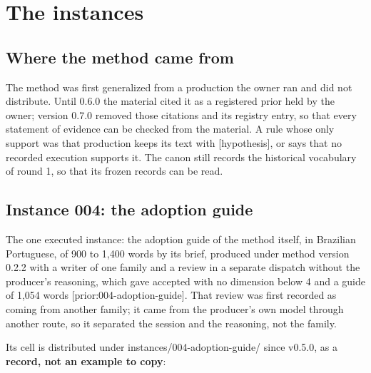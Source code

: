 \documentclass[
  american,
  10pt,
]{report}
\renewcommand{\texttt}[1]{{\ttfamily\hyphenchar\font=-1 #1}}
\begin{document}
\chapter{The instances}\label{the-instances}

\section{Where the method came from}\label{where-the-method-came-from}

The method was first generalized from a production the owner ran and did
not distribute. Until 0.6.0 the material cited it as a registered prior
held by the owner; version 0.7.0 removed those citations and its
registry entry, so that every statement of evidence can be checked from
the material. A rule whose only support was that production keeps its
text with \texttt{[hypothesis]}, or says that no recorded execution
supports it. The canon still records the historical vocabulary of round
1, so that its frozen records can be read.

\section{Instance 004: the adoption
guide}\label{instance-004-the-adoption-guide}

The one executed instance: the adoption guide of the method itself, in
Brazilian Portuguese, of 900 to 1,400 words by its brief, produced under
method version 0.2.2 with a writer of one family and a review in a
separate dispatch without the producer's reasoning, which gave
\texttt{accepted} with no dimension below 4 and a guide of 1,054 words
\texttt{[prior:\allowbreak{}004-\allowbreak{}adoption-\allowbreak{}guide]}.
That review was first recorded as coming from another family; it came
from the producer's own model through another route, so it separated the
session and the reasoning, not the family.

Its cell is distributed under
\texttt{instances/\allowbreak{}004-\allowbreak{}adoption-\allowbreak{}guide/\allowbreak{}}
since v0.5.0, as a \textbf{record, not an example to copy}:
\end{document}
